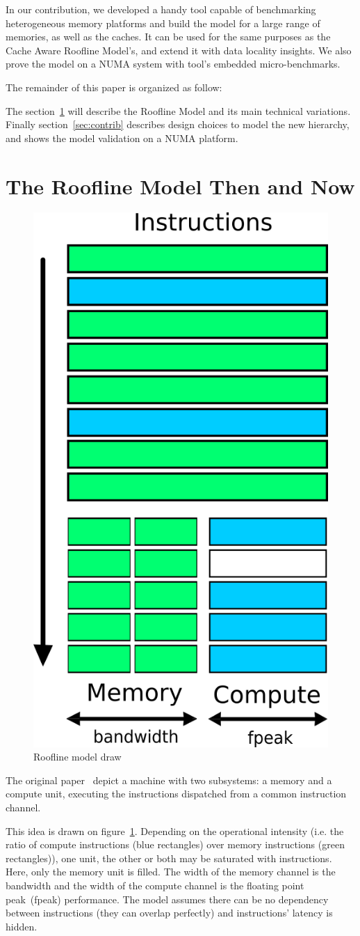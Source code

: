 \documentclass[twoside,twocolumn,8pt]{extarticle}
\begin{document}
In our contribution, we developed a handy tool capable of benchmarking heterogeneous memory platforms and build the model for a
large range of memories, as well as the caches.
It can be used for the same purposes as the Cache Aware Roofline Model's, and extend it with data locality insights.
We also prove the model on a NUMA system with tool's embedded micro-benchmarks.

The remainder of this paper is organized as follow:

The section~\ref{sec:state_of_art} will describe the Roofline Model and its main technical variations.
Finally section~\ref{sec:contrib} describes design choices to model the new hierarchy, and shows the model validation on a NUMA
platform.

\section{The Roofline Model Then and Now}\label{sec:state_of_art}
\begin{figure}
  \centering
  \includegraphics[width=.2\textwidth]{pictures/model_drawing}
  \caption{Roofline model draw}
  \label{fig:roofline_draw}
\end{figure}

The original paper~\cite{Williams:2009:RIV:1498765.1498785} depict a machine with two subsystems: a memory and a compute unit,
executing the instructions dispatched from a common instruction channel.

This idea is drawn on figure~\ref{fig:roofline_draw}.
Depending on the operational intensity (i.e. the ratio of compute instructions (blue rectangles) over memory instructions (green
rectangles)), one unit, the other or both may be saturated with instructions. Here, only the memory unit is filled. 
The width of the memory channel is the bandwidth and the width of the compute channel is the floating point peak~(fpeak)
performance.
The model assumes there can be no dependency between instructions (they can overlap perfectly) and instructions' latency is
hidden.
\end{document}
